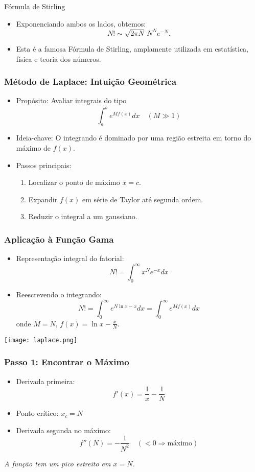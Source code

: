 \documentclass[11pt]{beamer}
\begin{document}
\begin{frame}{Fórmula de Stirling}
  \begin{itemize}
    \item Exponenciando ambos os lados, obtemos:
      \[
      N! \sim \sqrt{2\pi N}\, N^N e^{-N}.
      \]
    \item Esta é a famosa Fórmula de Stirling, amplamente utilizada em estatística, física e teoria dos números.
  \end{itemize}
\end{frame}



\begin{frame}
\frametitle{Método de Laplace: Intuição Geométrica}
\begin{itemize}
\item Propósito: Avaliar integrais do tipo
\[ \int_a^b e^{M f(x)} dx \quad (M \gg 1) \]
\item Ideia-chave: O integrando é dominado por uma região estreita em torno do máximo de \( f(x) \).

\item Passos principais:
\begin{enumerate}
\item Localizar o ponto de máximo \( x = c \).
\item Expandir \( f(x) \) em série de Taylor até segunda ordem.
\item Reduzir o integral a um gaussiano.
\end{enumerate}
\end{itemize}
\end{frame}

\begin{frame}
\frametitle{Aplicação à Função Gama}
\begin{itemize}
\item Representação integral do fatorial:
\[ N! = \int_0^\infty x^N e^{-x} dx \]
\item Reescrevendo o integrando:
\[
N! = \int_0^\infty e^{N \ln x - x} dx = \int_0^\infty e^{M f(x)} dx
\]
onde \( M = N \), \( f(x) = \ln x - \frac{x}{N} \).
\end{itemize}
\end{frame}

\begin{frame}
  \texttt{[image: laplace.png]}
\end{frame}

\begin{frame}
\frametitle{Passo 1: Encontrar o Máximo}
\begin{itemize}
\item Derivada primeira:
\[ f'(x) = \frac{1}{x} - \frac{1}{N} \]
\item Ponto crítico: \( x_c = N \)
\item Derivada segunda no máximo:
\[ f''(N) = -\frac{1}{N^2} \quad (< 0 \Rightarrow \text{máximo}) \]
\end{itemize}
\begin{center}
    \textit{A função tem um pico estreito em \( x = N \).}
\end{center}
\end{frame}
\end{document}

